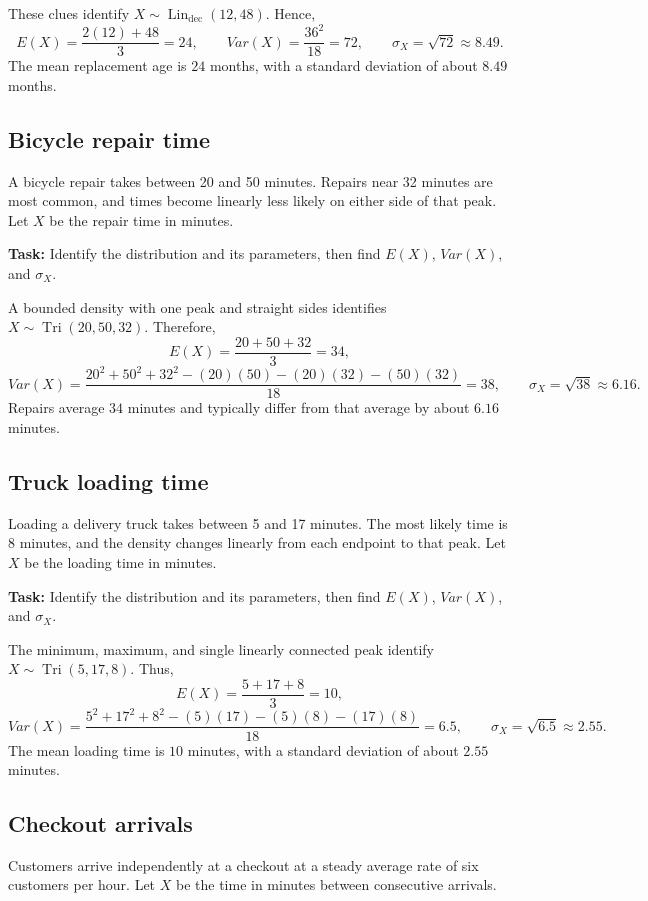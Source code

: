 These clues identify $X\sim\operatorname{Lin}_{\mathrm{dec}}(12,48)$. Hence,
\[
E(X)=\frac{2(12)+48}{3}=24,\qquad
Var(X)=\frac{36^2}{18}=72,\qquad
\sigma_X=\sqrt{72}\approx8.49.
\]
The mean replacement age is $24$ months, with a standard deviation of about
$8.49$ months.

\subsection{Bicycle repair time}\label{sec:c4-context-repair}
A bicycle repair takes between 20 and 50 minutes. Repairs near 32 minutes are
most common, and times become linearly less likely on either side of that peak.
Let $X$ be the repair time in minutes.

\textbf{Task:} Identify the distribution and its parameters, then find
$E(X)$, $Var(X)$, and $\sigma_X$.

A bounded density with one peak and straight sides identifies
$X\sim\operatorname{Tri}(20,50,32)$. Therefore,
\[
E(X)=\frac{20+50+32}{3}=34,
\]
\[
Var(X)=\frac{20^2+50^2+32^2-(20)(50)-(20)(32)-(50)(32)}{18}=38,
\qquad \sigma_X=\sqrt{38}\approx6.16.
\]
Repairs average $34$ minutes and typically differ from that average by about
$6.16$ minutes.

\subsection{Truck loading time}\label{sec:c4-context-loading}
Loading a delivery truck takes between 5 and 17 minutes. The most likely time is
8 minutes, and the density changes linearly from each endpoint to that peak.
Let $X$ be the loading time in minutes.

\textbf{Task:} Identify the distribution and its parameters, then find
$E(X)$, $Var(X)$, and $\sigma_X$.

The minimum, maximum, and single linearly connected peak identify
$X\sim\operatorname{Tri}(5,17,8)$. Thus,
\[
E(X)=\frac{5+17+8}{3}=10,
\]
\[
Var(X)=\frac{5^2+17^2+8^2-(5)(17)-(5)(8)-(17)(8)}{18}=6.5,
\qquad \sigma_X=\sqrt{6.5}\approx2.55.
\]
The mean loading time is $10$ minutes, with a standard deviation of about
$2.55$ minutes.

\subsection{Checkout arrivals}\label{sec:c4-context-checkout}
Customers arrive independently at a checkout at a steady average rate of six
customers per hour. Let $X$ be the time in minutes between consecutive
arrivals.

